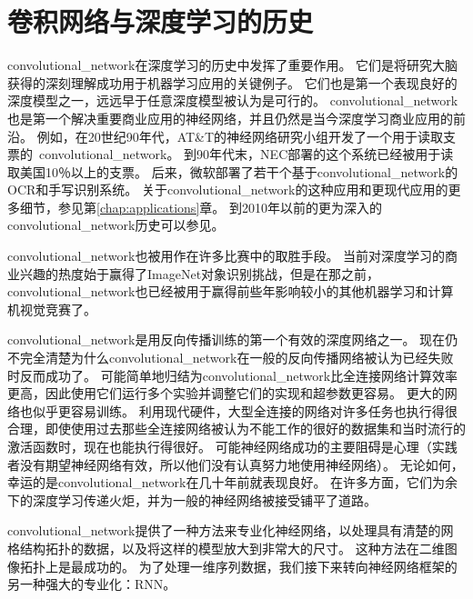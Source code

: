 \section{卷积网络与深度学习的历史}
\label{sec:convolutional_networks_and_the_history_of_deep_learning}
 
 
\gls{convolutional_network}在深度学习的历史中发挥了重要作用。
它们是将研究大脑获得的深刻理解成功用于机器学习应用的关键例子。
它们也是第一个表现良好的深度模型之一，远远早于任意深度模型被认为是可行的。
\gls{convolutional_network}也是第一个解决重要商业应用的神经网络，并且仍然是当今深度学习商业应用的前沿。
例如，在20世纪90年代，AT\&T的神经网络研究小组开发了一个用于读取支票的~\gls{convolutional_network}\citep{chapter-gradient-document-2001}。
到90年代末，NEC部署的这个系统已经被用于读取美国10％以上的支票。
后来，微软部署了若干个基于\gls{convolutional_network}的OCR和手写识别系统\citep{simard-03-small}。 
关于\gls{convolutional_network}的这种应用和更现代应用的更多细节，参见第\ref{chap:applications}章。
到2010年以前的更为深入的\gls{convolutional_network}历史可以参见\citep{Lecun_convolutionalnetworks}。

\gls{convolutional_network}也被用作在许多比赛中的取胜手段。
当前对深度学习的商业兴趣的热度始于\cite{Krizhevsky-2012-small}赢得了ImageNet对象识别挑战，但是在那之前，\gls{convolutional_network}也已经被用于赢得前些年影响较小的其他机器学习和计算机视觉竞赛了。
 
 
\gls{convolutional_network}是用反向传播训练的第一个有效的深度网络之一。
现在仍不完全清楚为什么\gls{convolutional_network}在一般的反向传播网络被认为已经失败时反而成功了。
可能简单地归结为\gls{convolutional_network}比全连接网络计算效率更高，因此使用它们运行多个实验并调整它们的实现和超参数更容易。
更大的网络也似乎更容易训练。
利用现代硬件，大型全连接的网络对许多任务也执行得很合理，即使使用过去那些全连接网络被认为不能工作的很好的数据集和当时流行的激活函数时，现在也能执行得很好。
可能神经网络成功的主要阻碍是心理（实践者没有期望神经网络有效，所以他们没有认真努力地使用神经网络）。
无论如何，幸运的是\gls{convolutional_network}在几十年前就表现良好。
在许多方面，它们为余下的深度学习传递火炬，并为一般的神经网络被接受铺平了道路。

\gls{convolutional_network}提供了一种方法来专业化神经网络，以处理具有清楚的网格结构拓扑的数据，以及将这样的模型放大到非常大的尺寸。 
这种方法在二维图像拓扑上是最成功的。
为了处理一维序列数据，我们接下来转向神经网络框架的另一种强大的专业化：\gls{RNN}。

 
 










